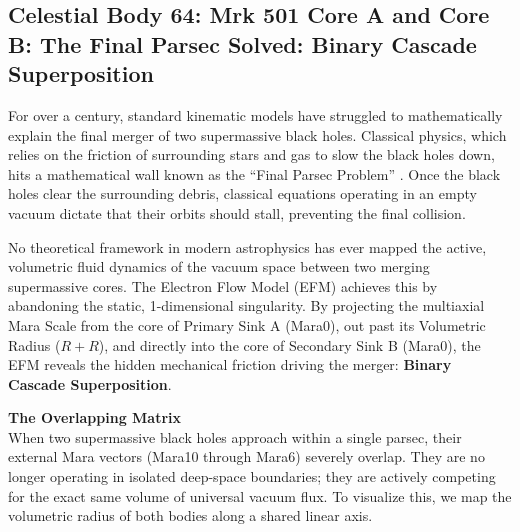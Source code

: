 \documentclass[11pt, a4paper]{article}
\begin{document}
\clearpage
\subsection{Celestial Body 64: Mrk 501 Core A and Core B: The Final Parsec Solved: Binary Cascade Superposition}

For over a century, standard kinematic models have struggled to mathematically explain the final merger of two supermassive black holes. Classical physics, which relies on the friction of surrounding stars and gas to slow the black holes down, hits a mathematical wall known as the ``Final Parsec Problem'' \cite{begelman1980}. Once the black holes clear the surrounding debris, classical equations operating in an empty vacuum dictate that their orbits should stall, preventing the final collision.

No theoretical framework in modern astrophysics has ever mapped the active, volumetric fluid dynamics of the vacuum space between two merging supermassive cores. The Electron Flow Model (EFM) achieves this by abandoning the static, 1-dimensional singularity. By projecting the multiaxial Mara Scale from the core of Primary Sink A (Mara0), out past its Volumetric Radius ($R+R$), and directly into the core of Secondary Sink B (Mara0), the EFM reveals the hidden mechanical friction driving the merger: \textbf{Binary Cascade Superposition}.

\vspace{0.5em}
\noindent \textbf{The Overlapping Matrix} \\
When two supermassive black holes approach within a single parsec, their external Mara vectors (Mara10 through Mara6) severely overlap. They are no longer operating in isolated deep-space boundaries; they are actively competing for the exact same volume of universal vacuum flux. To visualize this, we map the volumetric radius of both bodies along a shared linear axis.
\end{document}
